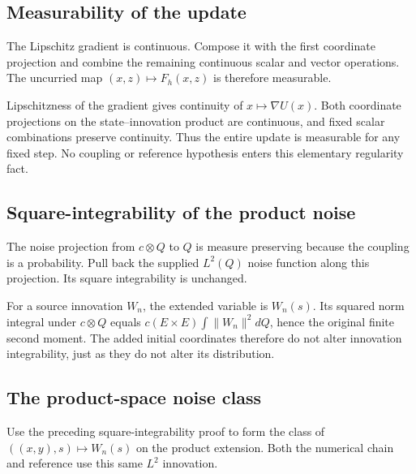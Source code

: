 \documentclass[11pt,a4paper]{report}
\begin{document}
\subsection{\texorpdfstring{Measurability of the update}{Measurability of the update}}
\label{report-step-UnadjustedLangevin-ProductReference-lean-2}


The Lipschitz gradient is continuous. Compose it with the first coordinate projection and combine the remaining continuous scalar and vector operations. The uncurried map \((x,z)\mapsto F_h(x,z)\) is therefore measurable.



Lipschitzness of the gradient gives continuity of \(x\mapsto\nabla U(x)\). Both coordinate projections on the state–innovation product are continuous, and fixed scalar combinations preserve continuity. Thus the entire update is measurable for any fixed step. No coupling or reference hypothesis enters this elementary regularity fact.

\subsection{\texorpdfstring{Square-integrability of the product noise}{Square-integrability of the product noise}}
\label{report-step-UnadjustedLangevin-ProductReference-lean-3}


The noise projection from \(c\otimes Q\) to \(Q\) is measure preserving because the coupling is a probability. Pull back the supplied \(L^2(Q)\) noise function along this projection. Its square integrability is unchanged.



For a source innovation \(W_n\), the extended variable is \(W_n(s)\). Its squared norm integral under \(c\otimes Q\) equals \(c(E\times E)\int\|W_n\|^2dQ\), hence the original finite second moment. The added initial coordinates therefore do not alter innovation integrability, just as they do not alter its distribution.

\subsection{\texorpdfstring{The product-space noise class}{The product-space noise class}}
\label{report-step-UnadjustedLangevin-ProductReference-lean-4}


Use the preceding square-integrability proof to form the class of \(((x,y),s)\mapsto W_n(s)\) on the product extension. Both the numerical chain and reference use this same \(L^2\) innovation.
\end{document}
